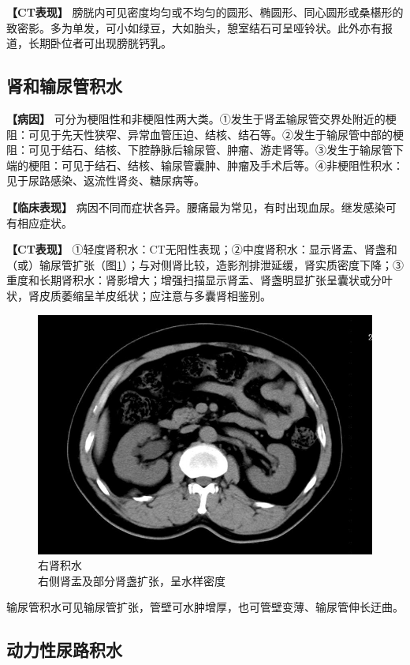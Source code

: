 \textbf{【CT表现】}
膀胱内可见密度均匀或不均匀的圆形、椭圆形、同心圆形或桑椹形的致密影。多为单发，可小如绿豆，大如胎头，憩室结石可呈哑铃状。此外亦有报道，长期卧位者可出现膀胱钙乳。

\subsection{肾和输尿管积水}

\textbf{【病因】}
可分为梗阻性和非梗阻性两大类。①发生于肾盂输尿管交界处附近的梗阻：可见于先天性狭窄、异常血管压迫、结核、结石等。②发生于输尿管中部的梗阻：可见于结石、结核、下腔静脉后输尿管、肿瘤、游走肾等。③发生于输尿管下端的梗阻：可见于结石、结核、输尿管囊肿、肿瘤及手术后等。④非梗阻性积水：见于尿路感染、返流性肾炎、糖尿病等。

\textbf{【临床表现】}
病因不同而症状各异。腰痛最为常见，有时出现血尿。继发感染可有相应症状。

\textbf{【CT表现】}
①轻度肾积水：CT无阳性表现；②中度肾积水：显示肾盂、肾盏和（或）输尿管扩张（图\ref{fig15-10}）；与对侧肾比较，造影剂排泄延缓，肾实质密度下降；③重度和长期肾积水：肾影增大；增强扫描显示肾盂、肾盏明显扩张呈囊状或分叶状，肾皮质萎缩呈羊皮纸状；应注意与多囊肾相鉴别。

\begin{figure}[!htbp]
 \centering
 \includegraphics[width=.7\textwidth,height=\textheight,keepaspectratio]{./images/Image00325.jpg}
 \captionsetup{justification=centering}
 \caption{右肾积水\\{\small 右侧肾盂及部分肾盏扩张，呈水样密度}}
 \label{fig15-10}
  \end{figure} 

输尿管积水可见输尿管扩张，管壁可水肿增厚，也可管壁变薄、输尿管伸长迂曲。

\subsection{动力性尿路积水}

